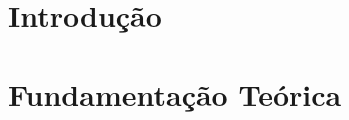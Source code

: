 \documentclass[tcc2, pos-defesa, english, brazil]{packages/ufgrc}
\begin{document}
\textual

\chapter{Introdução}
\label{chapter:introducao}


\chapter{Fundamentação Teórica}
\label{chapter:fundamentacao}


\postextual




\glsaddall
\printglossaries
\end{document}
